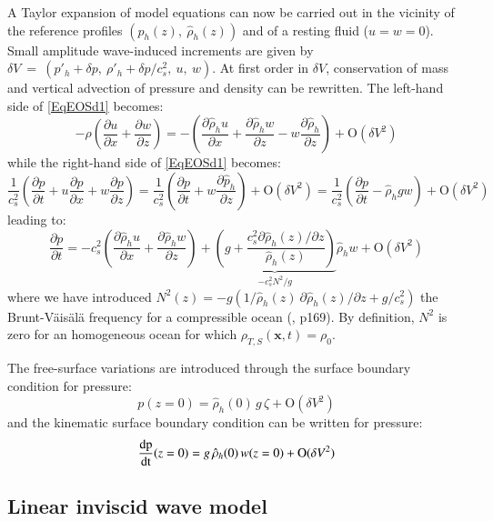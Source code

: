 \documentclass[a4paper,11pt]{article}
\begin{document}
A Taylor expansion of model equations can now be carried out in the vicinity of the reference profiles $(\hat{p}_h(z),\ \hat{\rho}_h(z))$ and of a resting fluid ($u=w=0$). Small amplitude wave-induced increments are given by $\delta V\ =\ (p'_h+\delta p,\ \rho'_h+\delta p/c_s^2,\ u ,\ w)$. At first order in $\delta V$, conservation of mass and vertical advection of pressure and density can be rewritten. The left-hand side of \ref{EqEOSd1} becomes:
%
\[
- \rho \left(\frac{\partial u}{\partial x}
+\frac{\partial w}{\partial z}
\right)=
- \left(
\frac{\partial \hat{\rho}_{h} u}{\partial x}
+
\frac{\partial \hat{\rho}_{h} w}{\partial z}
- w \frac{\partial \hat{\rho}_{h} }{\partial z}
\right)
 +\mathrm{O}(\delta V^2)
\]
%
while the right-hand side of \ref{EqEOSd1} becomes:
%
\[
	\frac{1}{c_s^2}\left(\frac{\partial p}{\partial t} 
+u \frac{\partial p}{\partial x}
+w \frac{\partial p}{\partial z}\right)=
	\frac{1}{c_s^2}\left(\frac{\partial p}{\partial t} 
+w\frac{\partial \hat{p}_h}{\partial z}\right)+\mathrm{O}(\delta V^2)
=
	\frac{1}{c_s^2}\left(\frac{\partial p}{\partial t} 
-\hat{\rho}_h gw	\right)
+\mathrm{O}(\delta V^2)
\]
%
leading to:
%
\begin{equation}
 \frac{\partial p}{\partial t} =
 -c_s^{2}\left(\frac{\partial \hat{\rho}_h u}{\partial x}
 +\frac{\partial \hat{\rho}_h w}{\partial z}\right)
 +\underbrace{\left(g+\frac{c_s^2 \partial \hat{\rho}_h(z)/\partial z}{\hat{\rho}_h(z)}\right)}_{-c_s^2 N^2/g}
 \hat{\rho}_h w+\mathrm{O}(\delta V^2)
 \label{Eq_EOS1}
\end{equation}
%
where we have introduced $N^2(z)=-g\left(1/\hat{\rho}_h(z)\ \partial \hat{\rho}_h(z)/\partial z+g/c_s^2\right)$ the Brunt-V\"ais\"al\"a frequency for a compressible ocean (\citealt{gill_1982}, p169). By definition, $N^2$ is zero for an homogeneous ocean for which $\rho_{T,S}(\mathbf{x},t)=\rho_0$.

The free-surface variations are introduced through the surface boundary condition for pressure:
\[
 p(z=0) = \hat{\rho}_h(0)\, g\, \zeta+\mathrm{O}(\delta V^2)
\]
and the kinematic surface boundary condition can be written for pressure:
\[
 \frac{\rm{d}p}{\rm{dt}}(z=0)= g\, \hat{\rho}_h(0)\, w(z=0)+\mathrm{O}(\delta V^2)
\]

\bigbreak
\subsection{Linear inviscid wave model}
\label{SubSectionLinModel}
\end{document}
